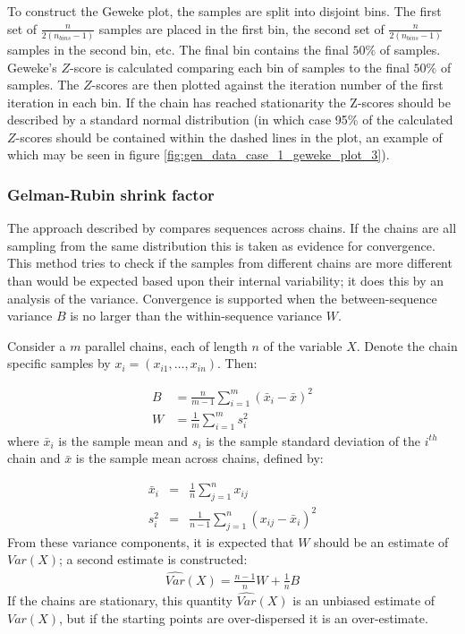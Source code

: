 \documentclass[14pt]{extarticle} %
\begin{document}
	To construct the Geweke plot, the samples are split into disjoint bins. The first set of $\frac{n}{2(n_{bins} -1)}$ samples are placed in the first bin, the second set of $\frac{n}{2(n_{bins} -1)}$ samples in the second bin, etc. The final bin contains the final $50\%$ of samples. Geweke's $Z$-score is calculated comparing each bin of samples to the final $50\%$ of samples. The $Z$-scores are then plotted against the iteration number of the first iteration in each bin. If the chain has reached stationarity the Z-scores should be described by a standard normal distribution (in which case 95\% of the calculated $Z$-scores should be contained within the dashed lines in the plot, an example of which may be seen in figure \ref{fig:gen_data_case_1_geweke_plot_3}).
	
	
	\subsubsection{Gelman-Rubin shrink factor}
	\label{sec:additional_theory:sub_sec:convergence:sub_sub_sec:gelman}
	The approach described by \citet{GelmanInferenceIterativeSimulation1992} compares sequences across chains. If the chains are all sampling from the same distribution this is taken as evidence for convergence. This method tries to check if the samples from different chains are more different than would be expected based upon their internal variability; it does this by an analysis of the variance. Convergence is supported when the between-sequence variance $B$ is no larger than the within-sequence variance $W$.
	
	Consider a $m$ parallel chains, each of length $n$ of the variable $X$. Denote the chain specific samples by $x_i = (x_{i1},\ldots,x_{in})$. Then:
	
	\begin{align}
	B &= \frac{n}{m-1}\sum_{i=1}^m (\bar{x}_i - \bar{x})^2 \\
	W &= \frac{1}{m}\sum_{i=1}^m s_i^2
	\end{align}
	where $\bar{x}_i$ is the sample mean and $s_i$ is the sample standard deviation of the $i^{th}$ chain and $\bar{x}$ is the sample mean across chains, defined by:
	
	\begin{eqnarray} \label{eqn:sample_parameters}
	\bar{x}_i &=& \frac{1}{n}\sum_{j=1}^n x_{ij} \\
	s_i^2 &=& \frac{1}{n - 1}\sum_{j=1}^n \left( x_{ij} - \bar{x}_i \right) ^2 
	\end{eqnarray}
	From these variance components, it is expected that $W$ should be an estimate of $Var(X)$; a second estimate is constructed:
	\begin{align}
	\hat{Var}(X) = \frac{n-1}{n}W + \frac{1}{n}B
	\end{align}
	If the chains are stationary, this quantity $\hat{Var}(X)$ is an unbiased estimate of $Var(X)$, but if the starting points are over-dispersed it is an over-estimate.
	
\end{document}
